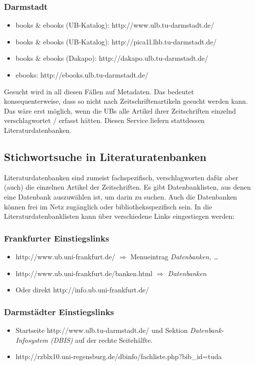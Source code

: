 \documentclass[DIV=calc,BCOR=5mm,11pt,headings=small,oneside,abstract=false, toc=bib]{scrartcl}
\begin{document}
\subsubsection{Darmstadt}
\begin{itemize}
  \item books \& ebooks (UB-Katalog): {\ttfamily
  http://www.ulb.tu-darmstadt.de/}
  \item books \& ebooks (UB-Katalog): {\ttfamily
  http://pica1l.lhb.tu-darmstadt.de/}
  \item books \& ebooks (Dakapo): {\ttfamily http://dakapo.ulb.tu-darmstadt.de/}
  \item ebooks: {\ttfamily http://ebooks.ulb.tu-darmstadt.de/}
\end{itemize}

Gesucht wird in all diesen Fällen auf Metadaten. Das bedeutet konsequenterweise,
dass so nicht nach Zeitschriftenartikeln gesucht werden kann. Das wäre erst
möglich, wenn die UBs alle Artikel ihrer Zeitschriften einzelnd
verschlagwortet / erfasst hätten. Diesen Service liefern stattdessen
Literaturdatenbanken.

\subsection{Stichwortsuche in Literaturatenbanken}

Literaturdatenbanken sind zumeist fachspezifisch, verschlagworten dafür
aber (auch) die einzelnen Artikel der Zeitschriften. Es gibt Datenbanklisten,
aus denen eine Datenbank auszuwählen ist, um darin zu suchen. Auch die
Datenbanken können frei im Netz zugänglich oder bibliotheksspezifisch sein. In
die Literaturdatenbanklisten kann über verschiedene Links eingestiegen werden:

\subsubsection{Frankfurter Einstiegslinks}
\begin{itemize}
  \item {\ttfamily http://www.ub.uni-frankfurt.de/} $\Rightarrow$ Menueintrag
  \emph{Datenbanken, \ldots}
  \item {\ttfamily http://www.ub.uni-frankfurt.de/banken.html} $\Rightarrow$ 
  \emph{Datenbanken}
  \item Oder direkt {\ttfamily http://info.ub.uni-frankfurt.de/}
\end{itemize}

\subsubsection{Darmstädter Einstiegslinks}
\begin{itemize}
  \item Startseite {\ttfamily http://www.ulb.tu-darmstadt.de/} und Sektion
  \emph{Datenbank-Infosystem (DBIS)} auf der rechte Seitehälfte.
  \item 
  {\ttfamily \small
  \small http://rzblx10.uni-regensburg.de/dbinfo/fachliste.php?bib\_id=tuda}
\end{itemize}
\end{document}
